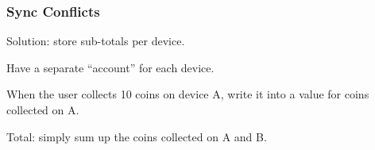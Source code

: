 \begin{frame}
\frametitle{Sync Conflicts}
\begin{changemargin}{1cm}

Solution: store sub-totals per device. 

Have a separate ``account'' for each device.

When the user collects 10 coins on device A, write it into a value for coins collected on A. 

Total: simply sum up the coins collected on A and B.


\end{changemargin}
\end{frame}




